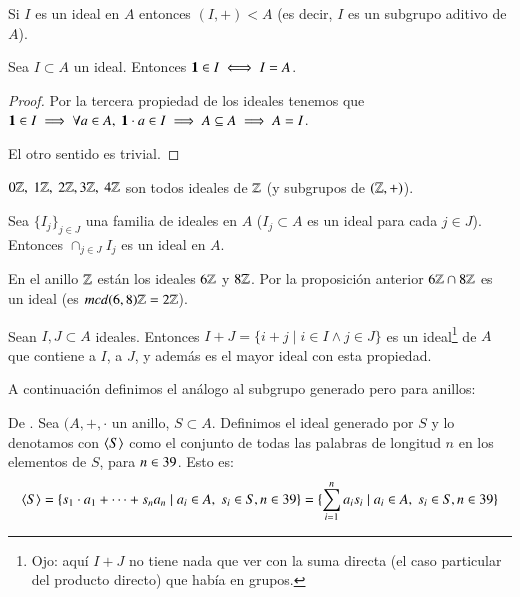 \begin{pro}
	Si $I$ es un ideal en $A$ entonces $(I, +) < A$ (es decir, $I$ es un subgrupo aditivo de $A$).
\end{pro}

\begin{pro}
	Sea $I \subset A$ un ideal. Entonces $\mathbf{1} \in I \iff I = A$.
\end{pro}

\begin{proof}
	Por la tercera propiedad de los ideales tenemos que $\mathbf{1} \in I \implies \forall a \in A,\ \mathbf{1} \cdot a \in I \implies A \subseteq A \implies A = I$.
	
	El otro sentido es trivial.
\end{proof}

\begin{ej}
	$0\mathbb{Z},\ 1\mathbb{Z},\ 2\mathbb{Z}, 3\mathbb{Z},\ 4\mathbb{Z}$ son todos ideales de $\mathbb{Z}$ (y subgrupos de $(\mathbb{Z}, +)$).
\end{ej}

\begin{pro}
	Sea $\{I_j\}_{j \in J}$ una familia de ideales en $A$ ($I_j \subset A$ es un ideal para cada $j \in J$). Entonces $\cap_{j \in J} I_j$ es un ideal en $A$.
\end{pro}

\begin{ej}
	En el anillo $\mathbb{Z}$ están los ideales $6\mathbb{Z}$ y $8\mathbb{Z}$. Por la proposición anterior $6\mathbb{Z} \cap 8\mathbb{Z}$ es un ideal (es $mcd(6,8)\mathbb{Z} = 2\mathbb{Z}$).
\end{ej}

\begin{pro}
	Sean $I, J \subset A$ ideales. Entonces $I + J = \{i + j \mid i \in I \land j \in J\}$ es un ideal\footnote{Ojo: aquí $I+J$ no tiene nada que ver con la suma directa (el caso particular del producto directo) que había en grupos.} de $A$ que contiene a $I$, a $J$, y además es el mayor ideal con esta propiedad.
\end{pro}

A continuación definimos el análogo al subgrupo generado pero para anillos:

\begin{dfn}
	De \cite{dor96}. Sea $(A, +, \cdot$ un anillo, $S \subset A$. Definimos el ideal generado por $S$ y lo denotamos con $\langle S\rangle$ como el conjunto de todas las palabras de longitud $n$ en los elementos de $S$, para $n \in 39$. Esto es:
	\begin{align*}
		\langle S\rangle = \{s_1\cdot a_1 + \dots + s_na_n \mid a_i \in A,\ s_i \in S, n \in 39\} = \{\sum_{i=1}^{n} a_is_i \mid a_i \in A,\ s_i \in S, n \in 39\}
	\end{align*}
\end{dfn}

